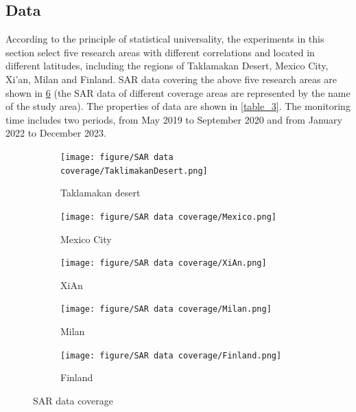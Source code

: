 \documentclass[preprint, authoryear]{elsarticle}
\begin{document}
\subsection{Data}

According to the principle of statistical universality, the experiments in this section select five research areas with different correlations and located in different latitudes, including the regions of Taklamakan Desert, Mexico City, Xi’an, Milan and Finland. SAR data covering the above five research areas are shown in \ref{fig_4} (the SAR data of different coverage areas are represented by the name of the study area). The properties of data are shown in \ref{table_3}. The monitoring time includes two periods, from May 2019 to September 2020 and from January 2022 to December 2023. \par

\begin{figure}
    \centering
    \begin{subfigure}{0.32\textwidth}
        \centering
        \texttt{[image: figure/SAR data coverage/TaklimakanDesert.png]}
        \caption{Taklamakan desert}
        \label{fig_4a}
    \end{subfigure}%
    \begin{subfigure}{0.32\textwidth}
        \centering
        \texttt{[image: figure/SAR data coverage/Mexico.png]}
        \caption{Mexico City}
        \label{fig_4b}
    \end{subfigure}
    \begin{subfigure}{0.32\textwidth}
        \centering
        \texttt{[image: figure/SAR data coverage/XiAn.png]}
        \caption{XiAn}
        \label{fig_4c}
    \end{subfigure}
    \medskip
    \begin{subfigure}{0.32\textwidth}
        \centering
        \texttt{[image: figure/SAR data coverage/Milan.png]}
        \caption{Milan}
        \label{fig_4d}
    \end{subfigure}%
    \begin{subfigure}{0.32\textwidth}
        \centering
        \texttt{[image: figure/SAR data coverage/Finland.png]}
        \caption{Finland}
        \label{fig_4e}
    \end{subfigure}
    \caption{SAR data coverage}
    \label{fig_4}
\end{figure}
\end{document}
